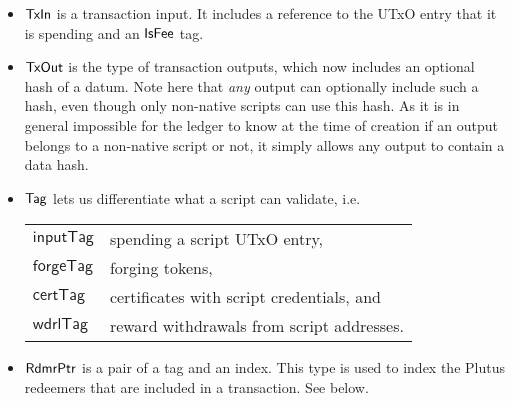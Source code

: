 \begin{itemize}
  \item $\mathsf{TxIn}$ is a transaction input. It includes a reference to the UTxO entry that it is spending
  and an $\mathsf{IsFee}$ tag.

  \item $\mathsf{TxOut}$ is the type of transaction outputs, which now includes
  an optional hash of a datum. Note here that \emph{any} output can
  optionally include such a hash, even though only non-native scripts
  can use this hash. As it is in general impossible for the ledger to
  know at the time of creation if an output belongs to a non-native
  script or not, it simply allows any output to contain a data hash.

  \item $\mathsf{Tag}$ lets us differentiate what a script
  can validate, i.e. \\
  \begin{tabular}{l@{~to validate~}l}
  $\mathsf{inputTag}$ & spending a script UTxO entry, \\
  $\mathsf{forgeTag}$ & forging tokens, \\
  $\mathsf{certTag}$  & certificates with script credentials, and  \\
  $\mathsf{wdrlTag}$ & reward withdrawals from script addresses.
  \end{tabular}

  \item $\mathsf{RdmrPtr}$ is a pair of a tag and an index. This type is
  used to index the Plutus redeemers that are included in a transaction. See
  below.

\end{itemize}


